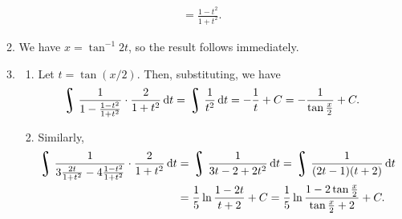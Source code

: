 \begin{enumerate}
\begin{enumerate}
\begin{gather*}
                 = \frac{1 - t^2}{1 + t^2}.
        \end{gather*}
      \item We have $ x = \tan^{-1} 2t $, so the result follows immediately.
      \item
        \begin{enumerate}
          \item Let $ t = \tan(x/2) $. Then, substituting, we have
            \begin{displaymath}
              \rint \frac{1}{1 - \frac{1 - t^2}{1 + t^2}} \cdot \frac{2}{1 + t^2} \dif{t} = \rint \frac{1}{t^2} \dif{t}
                                                                                          = -\frac{1}{t} + C = -\frac{1}{\tan\frac{x}{2}} + C.
            \end{displaymath}
          \item Similarly,
            \begin{align*}
              \rint \frac{1}{3\frac{2t}{1 + t^2} - 4\frac{1 - t^2}{1 + t^2}} \cdot \frac{2}{1 + t^2} \dif{t}
                  &= \rint \frac{1}{3t - 2 + 2t^2} \dif{t} = \rint \frac{1}{(2t - 1)(t + 2)} \dif{t}\\
                  &= \frac{1}{5}\ln\frac{1 - 2t}{t + 2} + C = \frac{1}{5}\ln\frac{1 - 2\tan\frac{x}{2}}{\tan\frac{x}{2} + 2} + C.
            \end{align*}
        \end{enumerate}
    \end{enumerate}
\end{enumerate}

